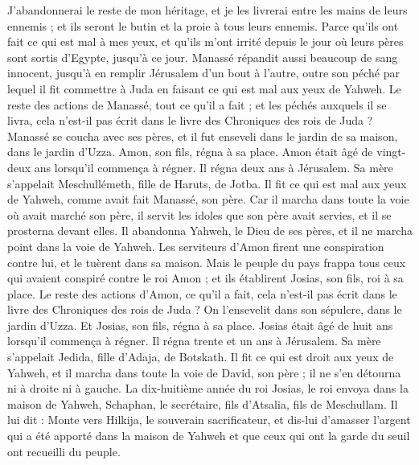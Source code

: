 \begin{multicols}{2}
J’abandonnerai le reste de mon héritage, et je les livrerai entre les mains de leurs ennemis ; et ils seront le butin et la proie à tous leurs ennemis.
Parce qu’ils ont fait ce qui est mal à mes yeux, et qu’ils m’ont irrité depuis le jour où leurs pères sont sortis d’Egypte, jusqu’à ce jour.
Manassé répandit aussi beaucoup de sang innocent, jusqu’à en remplir Jérusalem d’un bout à l’autre, outre son péché par lequel il fit commettre à Juda en faisant ce qui est mal aux yeux de Yahweh.
Le reste des actions de Manassé, tout ce qu’il a fait ; et les péchés auxquels il se livra, cela n’est-il pas écrit dans le livre des Chroniques des rois de Juda ?
Manassé se coucha avec ses pères, et il fut enseveli dans le jardin de sa maison, dans le jardin d’Uzza. Amon, son fils, régna à sa place.
Amon était âgé de vingt-deux ans lorsqu’il commença à régner. Il régna deux ans à Jérusalem. Sa mère s’appelait Meschullémeth, fille de Haruts, de Jotba.
Il fit ce qui est mal aux yeux de Yahweh, comme avait fait Manassé, son père.
Car il marcha dans toute la voie où avait marché son père, il servit les idoles que son père avait servies, et il se prosterna devant elles.
Il abandonna Yahweh, le Dieu de ses pères, et il ne marcha point dans la voie de Yahweh.
Les serviteurs d’Amon firent une conspiration contre lui, et le tuèrent dans sa maison.
Mais le peuple du pays frappa tous ceux qui avaient conspiré contre le roi Amon ; et ils établirent Josias, son fils, roi à sa place.
Le reste des actions d’Amon, ce qu’il a fait, cela n’est-il pas écrit dans le livre des Chroniques des rois de Juda ?
On l’ensevelit dans son sépulcre, dans le jardin d’Uzza. Et Josias, son fils, régna à sa place.
\VerseOne{}Josias était âgé de huit ans lorsqu’il commença à régner. Il régna trente et un ans à Jérusalem. Sa mère s’appelait Jedida, fille d’Adaja, de Botskath.
Il fit ce qui est droit aux yeux de Yahweh, et il marcha dans toute la voie de David, son père ; il ne s’en détourna ni à droite ni à gauche.
La dix-huitième année du roi Josias, le roi envoya dans la maison de Yahweh, Schaphan, le secrétaire, fils d’Atsalia, fils de Meschullam.
Il lui dit : Monte vers Hilkija, le souverain sacrificateur, et dis-lui d’amasser l’argent qui a été apporté dans la maison de Yahweh et que ceux qui ont la garde du seuil ont recueilli du peuple.

\end{multicols}
